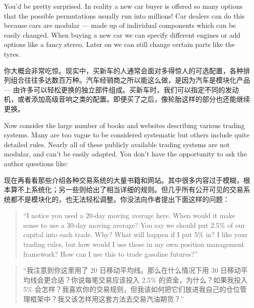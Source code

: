 \begin{englishblock} You'd be pretty surprised. In reality a new car buyer is offered so many options that the possible permutations usually run into millions! Car dealers can do this because cars are modular --- made up of individual components which can be easily changed. When buying a new car we can specify different engines or add options like a fancy stereo. Later on we can still change certain parts like the tyres. \end{englishblock}

\begin{chineseblock}你大概会非常吃惊。现实中，买新车的人通常会面对多得惊人的可选配置，各种排列组合往往多达数百万种。汽车经销商之所以能这么做，是因为汽车是模块化产品--- 由许多可以轻松更换的独立部件组成。买新车时，我们可以指定不同的发动机，或者添加高级音响之类的配置。即便买了之后，像轮胎这样的部分也还能继续更换。\end{chineseblock}

\bipairgap

\begin{englishblock} Now consider the large number of books and websites describing various trading systems. Many are too vague to be considered systematic but others include quite detailed rules. Nearly all of these publicly available trading systems are not modular, and can't be easily adapted. You don't have the opportunity to ask the author questions like: \end{englishblock}

\begin{chineseblock}现在再看看那些介绍各种交易系统的大量书籍和网站。其中很多内容过于模糊，根本算不上系统化；另一些则给出了相当详细的规则。但几乎所有公开可见的交易系统都不是模块化的，也无法轻松调整。你没法向作者提出下面这样的问题：\end{chineseblock}

\begin{quote}
\begingroup\color{\englishbodycolorname} ``I notice you used a 20-day moving average here. When would it make sense to use a 30-day moving average? You say we should put 2.5\% of our capital into each trade. Why? What will happen if I put 5\% in? I like your trading rules, but how would I use those in my own position management framework? How can I use this to trade gasoline futures?'' \endgroup
\end{quote}

\begin{quote}
\begingroup\color{\chinesebodycolorname}“我注意到你这里用了 20 日移动平均线。那么在什么情况下用 30 日移动平均线会更合适？你说每笔交易应该投入 2.5\% 的资金，为什么？如果我投入 5\% 会怎样？我喜欢你的交易规则，但我该如何把它们放进我自己的仓位管理框架中？我又该怎样用这套方法去交易汽油期货？”\endgroup
\end{quote}

